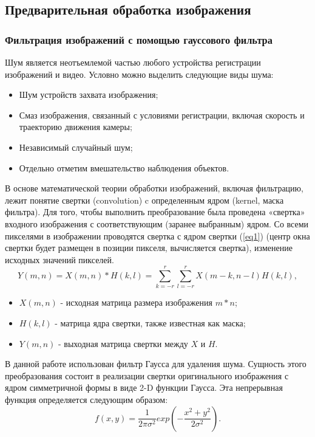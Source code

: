 \subsection{Предварительная обработка изображения} \label{part2.2.1}
\subsubsection{Фильтрация изображений с помощью гауссового фильтра}
Шум является неотъемлемой частью любого устройства регистрации изображений и видео. Условно можно выделить следующие виды шума:

\begin{itemize}
	\item Шум  устройств захвата изображения;
	\item Смаз изображения, связанный с условиями регистрации, включая скорость и траекторию движения камеры;
	\item Независимый случайный шум;
	\item Отдельно отметим вмешательство наблюдения объектов.
\end{itemize}

В основе математической теории обработки изображений, включая фильтрацию, лежит понятие свертки (convolution) c определенным ядром (kernel, маска фильтра). Для того, чтобы выполнить преобразование была проведена «свертка» входного изображения с соответствующим (заранее выбранным) ядром. Со всеми пикселями в изображении проводятся свертка с ядром свертки (\ref{eq1}) (центр окна свертки будет размещен в позиции пикселя, вычисляется свертка), изменение исходных значений пикселей.
\begin{equation}\label{eq1}
Y\left(m,n\right)=X\left(m,n\right)\ast H\left(k,l\right)=\sum^r_{k=-r}\sum^r_{l=-r}X\left(m-k,n-l\right)H\left(k,l\right),
\end{equation}

\begin{itemize}
	\item $X\left(m,n\right)$ - исходная матрица размера изображения $m\ast n$;
	\item $H\left(k,l\right)$ - матрица ядра свертки, также известная как маска;
	\item $Y\left(m,n\right)$ - выходная матрица свертки между $X$ и $H$.
\end{itemize}

В данной работе использован фильтр Гаусса для удаления шума. Сущность этого преобразования состоит в реализации свертки оригинального изображения с ядром симметричной формы в виде 2-D функции Гаусса. Эта непрерывная функция определяется следующим образом:
\begin{equation}\label{eq2}
f\left(x,y\right)=\frac{1}{2\pi\sigma^2}exp\left(-\frac{x^2+y^2}{2\sigma^2}\right).
\end{equation}

